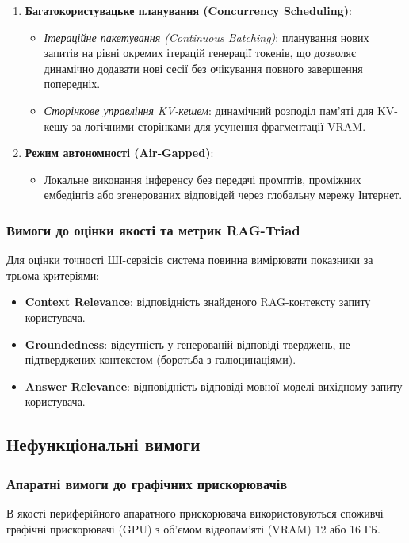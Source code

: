 \documentclass{article}
\begin{document}
\begin{enumerate}
    \item \textbf{Багатокористувацьке планування (Concurrency Scheduling)}:
    \begin{itemize}
        \item \textit{Ітераційне пакетування (Continuous Batching)}: планування нових запитів на рівні окремих ітерацій генерації токенів, що дозволяє динамічно додавати нові сесії без очікування повного завершення попередніх.
        \item \textit{Сторінкове управління KV-кешем}: динамічний розподіл пам'яті для KV-кешу за логічними сторінками для усунення фрагментації VRAM.
    \end{itemize}
    
    \item \textbf{Режим автономності (Air-Gapped)}:
    \begin{itemize}
        \item Локальне виконання інференсу без передачі промптів, проміжних ембедінгів або згенерованих відповідей через глобальну мережу Інтернет.
    \end{itemize}
\end{enumerate}

\subsubsection{Вимоги до оцінки якості та метрик RAG-Triad}
Для оцінки точності ШІ-сервісів система повинна вимірювати показники за трьома критеріями:
\begin{itemize}
    \item \textbf{Context Relevance}: відповідність знайденого RAG-контексту запиту користувача.
    \item \textbf{Groundedness}: відсутність у генерованій відповіді тверджень, не підтверджених контекстом (боротьба з галюцинаціями).
    \item \textbf{Answer Relevance}: відповідність відповіді мовної моделі вихідному запиту користувача.
\end{itemize}

\subsection{Нефункціональні вимоги}

\subsubsection{Апаратні вимоги до графічних прискорювачів}
В якості периферійного апаратного прискорювача використовуються споживчі графічні прискорювачі (GPU) з об'ємом відеопам'яті (VRAM) 12 або 16 ГБ.
\end{document}
